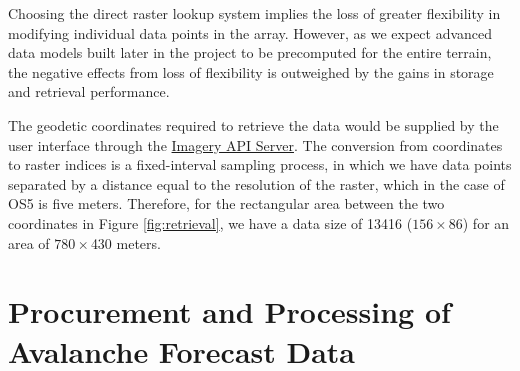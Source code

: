 \documentclass[11pt, oneside]{article}
\begin{document}
		Choosing the direct raster lookup system implies the loss of greater flexibility in modifying individual data points in the array. However, as we expect advanced data models built later in the project to be precomputed for the entire terrain, the negative effects from loss of flexibility is outweighed by the gains in storage and retrieval performance.
		
		The geodetic coordinates required to retrieve the data would be supplied by the user interface through the \hyperref[sec:APIServer]{Imagery API Server}. The conversion from coordinates to raster indices is a fixed-interval sampling process, in which we have data points separated by a distance equal to the resolution of the raster, which in the case of OS5 is five meters. Therefore, for the rectangular area between the two coordinates in Figure \ref{fig:retrieval}, we have a data size of 13416 ($156 \times $86) for an area of $780 \times $430 meters.
		
\section{Procurement and Processing of Avalanche Forecast Data}
\end{document}

